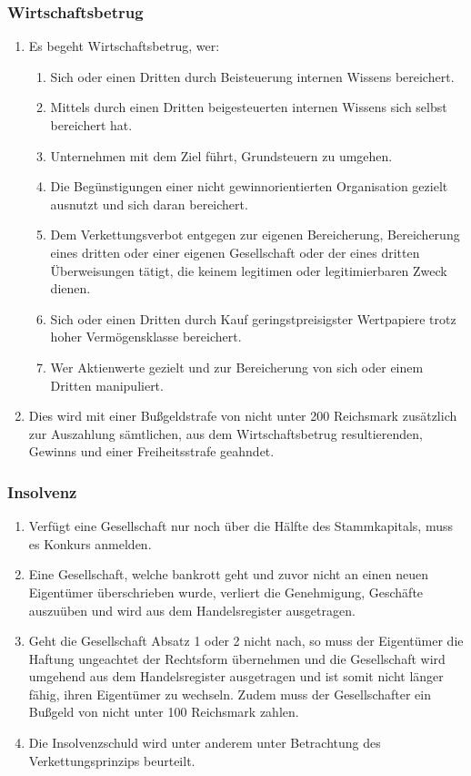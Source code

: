 \documentclass{article}
\begin{document}
\subsubsection{Wirtschaftsbetrug}
\begin{enumerate}[(1)]
    \item Es begeht Wirtschaftsbetrug, wer:
    \begin{enumerate}[1.]
        \item Sich oder einen Dritten durch Beisteuerung internen Wissens bereichert.
        \item Mittels durch einen Dritten beigesteuerten internen Wissens sich selbst bereichert hat.
        \item Unternehmen mit dem Ziel führt, Grundsteuern zu umgehen.
        \item Die Begünstigungen einer nicht gewinnorientierten Organisation gezielt ausnutzt und sich daran bereichert.
        \item Dem Verkettungsverbot entgegen zur eigenen Bereicherung, Bereicherung eines dritten oder einer eigenen Gesellschaft oder der eines dritten Überweisungen tätigt, die keinem legitimen oder legitimierbaren Zweck dienen.
        \item Sich oder einen Dritten durch Kauf geringstpreisigster Wertpapiere trotz hoher Vermögensklasse bereichert.
        \item Wer Aktienwerte gezielt und zur Bereicherung von sich oder einem Dritten manipuliert.
    \end{enumerate}
    \item Dies wird mit einer Bußgeldstrafe von nicht unter 200 Reichsmark zusätzlich zur Auszahlung sämtlichen, aus dem Wirtschaftsbetrug
    resultierenden, Gewinns und einer Freiheitsstrafe geahndet.
\end{enumerate}


\subsubsection{Insolvenz}\label{apored}
\begin{enumerate}[(1)]
    \item Verfügt eine Gesellschaft nur noch über die Hälfte des Stammkapitals, muss es Konkurs anmelden.
    \item Eine Gesellschaft, welche bankrott geht und zuvor nicht an einen neuen Eigentümer überschrieben wurde, verliert die Genehmigung, Geschäfte auszuüben und wird aus dem Handelsregister ausgetragen.
    \item Geht die Gesellschaft Absatz 1 oder 2 nicht nach, so muss der Eigentümer die Haftung ungeachtet der Rechtsform übernehmen und die Gesellschaft wird umgehend aus dem Handelsregister ausgetragen und ist somit nicht länger fähig, ihren Eigentümer zu wechseln. Zudem muss der Gesellschafter ein Bußgeld von nicht unter 100 Reichsmark zahlen.
    \item Die Insolvenzschuld wird unter anderem unter Betrachtung des Verkettungsprinzips beurteilt.
\end{enumerate}
\end{document}

